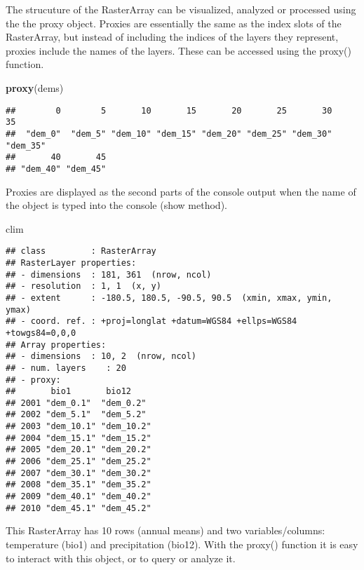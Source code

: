 \documentclass[]{article}
\newenvironment{Shaded}{\begin{snugshade}}{\end{snugshade}}
\newcommand{\KeywordTok}[1]{\textcolor[rgb]{0.13,0.29,0.53}{\textbf{#1}}}
\newcommand{\NormalTok}[1]{#1}
\begin{document}
The strucuture of the RasterArray can be visualized, analyzed or
processed using the the proxy object. Proxies are essentially the same
as the index slots of the RasterArray, but instead of including the
indices of the layers they represent, proxies include the names of the
layers. These can be accessed using the proxy() function.

\begin{Shaded}
\begin{Highlighting}[]
\KeywordTok{proxy}\NormalTok{(dems)}
\end{Highlighting}
\end{Shaded}

\begin{verbatim}
##        0        5       10       15       20       25       30       35 
##  "dem_0"  "dem_5" "dem_10" "dem_15" "dem_20" "dem_25" "dem_30" "dem_35" 
##       40       45 
## "dem_40" "dem_45"
\end{verbatim}

Proxies are displayed as the second parts of the console output when the
name of the object is typed into the console (show method).

\begin{Shaded}
\begin{Highlighting}[]
\NormalTok{clim}
\end{Highlighting}
\end{Shaded}

\begin{verbatim}
## class         : RasterArray 
## RasterLayer properties: 
## - dimensions  : 181, 361  (nrow, ncol)
## - resolution  : 1, 1  (x, y)
## - extent      : -180.5, 180.5, -90.5, 90.5  (xmin, xmax, ymin, ymax)
## - coord. ref. : +proj=longlat +datum=WGS84 +ellps=WGS84 +towgs84=0,0,0 
## Array properties: 
## - dimensions  : 10, 2  (nrow, ncol)
## - num. layers    : 20
## - proxy:
##       bio1       bio12     
## 2001 "dem_0.1"  "dem_0.2" 
## 2002 "dem_5.1"  "dem_5.2" 
## 2003 "dem_10.1" "dem_10.2"
## 2004 "dem_15.1" "dem_15.2"
## 2005 "dem_20.1" "dem_20.2"
## 2006 "dem_25.1" "dem_25.2"
## 2007 "dem_30.1" "dem_30.2"
## 2008 "dem_35.1" "dem_35.2"
## 2009 "dem_40.1" "dem_40.2"
## 2010 "dem_45.1" "dem_45.2"
\end{verbatim}

This RasterArray has 10 rows (annual means) and two variables/columns:
temperature (bio1) and precipitation (bio12). With the proxy() function
it is easy to interact with this object, or to query or analyze it.
\end{document}
